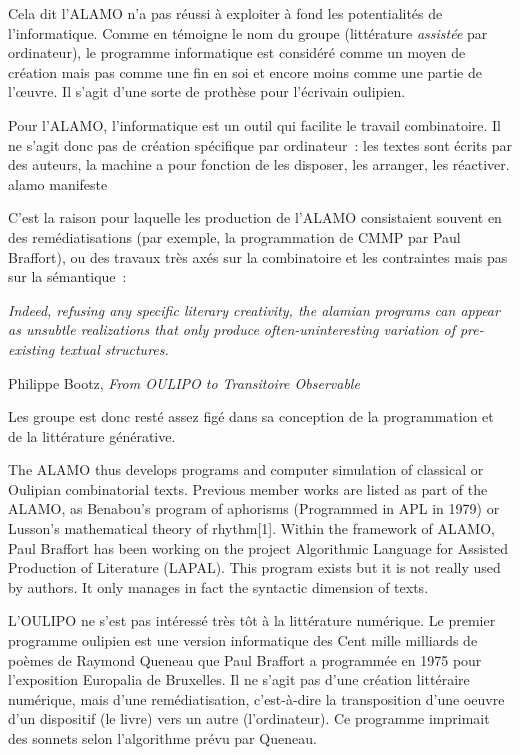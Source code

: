 \documentclass{article}
\newenvironment{citationbox}
{\begin{center}
		\begin{minipage}{.8\textwidth}
		}
		{
		\end{minipage}	
\end{center}
}
\begin{document}
				
				Cela dit l'ALAMO n'a pas réussi à exploiter à fond les potentialités de l'informatique. Comme en témoigne le nom du groupe (littérature \textit{assistée} par ordinateur), le programme informatique est considéré comme un moyen de création mais pas comme une fin en soi et encore moins comme une partie de l'œuvre. Il s'agit d'une sorte de prothèse pour l'écrivain oulipien.
				\begin{citationbox}
					Pour l’ALAMO, l’informatique est un outil qui facilite le travail combinatoire. Il ne s’agit donc pas de création spécifique par ordinateur~: les textes sont écrits par des auteurs, la machine a pour fonction de les disposer, les arranger, les réactiver.
					alamo manifeste
				\end{citationbox}
				C'est la raison pour laquelle les production de l'ALAMO consistaient souvent en des  remédiatisations (par exemple, la programmation de CMMP par Paul Braffort), ou des travaux très axés sur la combinatoire et les contraintes mais pas sur la sémantique~:
				\begin{citationbox}
					\textit{Indeed, refusing any specific literary creativity, the alamian programs can appear as unsubtle realizations that only produce often-uninteresting variation of pre-existing textual structures.}
					\begin{flushleft}
						Philippe Bootz, \textit{From OULIPO to Transitoire Observable} \cite{bootz2012}
					\end{flushleft}
				\end{citationbox}
				Les groupe est donc resté assez figé dans sa conception de la programmation et de la littérature générative.
				
				
				
				
				The ALAMO thus develops programs and computer simulation of classical or Oulipian combinatorial texts. Previous member works are listed as part of the ALAMO, as Benabou's program of aphorisms (Programmed in APL in 1979) or Lusson's mathematical theory of rhythm[1]. Within the framework of ALAMO, Paul Braffort has been working on the project Algorithmic Language for Assisted Production of Literature (LAPAL). This program exists but it is not really used by authors. It only manages in fact the syntactic dimension of texts.
				
		
				
				
				L'OULIPO ne s'est pas intéressé très tôt à la littérature numérique. Le premier programme oulipien est une version informatique des Cent mille milliards de poèmes de Raymond Queneau que Paul Braffort a programmée en 1975 pour l'exposition Europalia de Bruxelles. Il ne s'agit pas d'une création littéraire numérique, mais d'une remédiatisation, c'est-à-dire la transposition d'une oeuvre d'un dispositif (le livre) vers un autre (l'ordinateur). Ce programme imprimait des sonnets selon l'algorithme prévu par Queneau.
				
\end{document}
